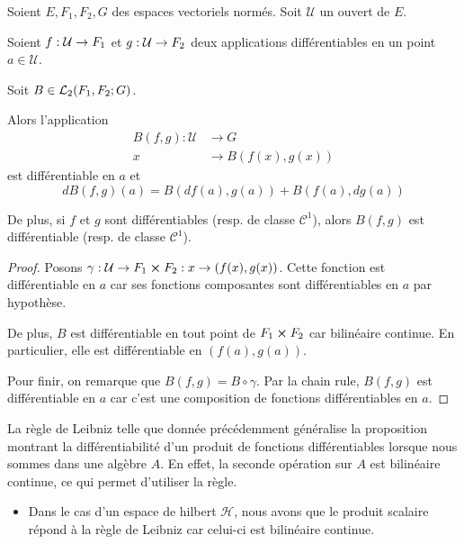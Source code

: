 \begin{proposition} 
	Soient $E, F_{1}, F_{2}, G$ des espaces vectoriels normés.
	Soit $\mathcal{U}$ un ouvert de $E$.

	Soient $\GSfunction{f}{\mathcal{U}}{F_{1}}$ et
	$\GSfunction{g}{\mathcal{U}}{F_{2}}$
	deux applications différentiables en un point $a \in \mathcal{U}$.

	Soit $B \in \GScontinueHomo[2]{F_{1}, F_{2}}{G}$.

	Alors l'application
	\begin{align}
		B(f, g) : 	\mathcal{U} &\rightarrow G \\
					x &\rightarrow B(f(x), g(x))
	\end{align}
	est différentiable en $a$ et
	\begin{equation}
		dB(f, g)(a) = B(df(a), g(a)) + B(f(a), dg(a))
	\end{equation}

	De plus, si $f$ et $g$ sont différentiables (resp. de classe
	$\mathcal{C}^{1}$), alors $B(f, g)$ est différentiable (resp. de classe
	$\mathcal{C}^{1}$).
\end{proposition}

\ifdefined\outputproof
\begin{proof}
	Posons $\gamma : \mathcal{U} \rightarrow F_{1} \cartprod F_{2} : x
	\rightarrow (f(x), g(x))$.
	Cette fonction est différentiable en $a$ car ses fonctions composantes sont
	différentiables en $a$ par hypothèse.

	De plus, $B$ est différentiable en tout point de $F_{1} \cartprod F_{2}$ car
	bilinéaire continue. En particulier, elle est différentiable en $(f(a),
	g(a))$.

	Pour finir, on remarque que $B(f, g) = B \circ \gamma$. Par la chain rule,
	$B(f, g)$ est différentiable en $a$ car c'est une composition de fonctions
	différentiables en $a$.
\end{proof}
\fi

\begin{remarque}
	La règle de Leibniz telle que donnée précédemment généralise la proposition
	montrant la différentiabilité d'un produit de fonctions différentiables
	lorsque nous sommes dans une algèbre $A$. En effet, la seconde opération sur
	$A$ est bilinéaire continue, ce qui permet d'utiliser la règle.
\end{remarque}

\begin{exemple}
	\begin{itemize}
		\item Dans le cas d'un espace de hilbert $\mathcal{H}$, nous avons que le
			produit scalaire répond à la règle de Leibniz car celui-ci est
			bilinéaire continue.
	\end{itemize}
\end{exemple}

